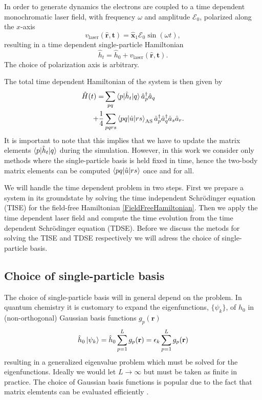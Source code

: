 \documentclass[a4paper,10pt, twocolumn]{article}
\begin{document}
In order to generate dynamics the electrons are coupled to a time dependent monochromatic laser field, with frequency $\omega$ and amplitude $\mathcal{E}_0$, polarized along the $x$-axis \cite{Zanghellini04}
\begin{equation}
 v_{\text{laser}}(\mathbf{\hat{r},t}) = \hat{\mathbf{x}}_1 \mathcal{E}_0 \sin(\omega t),
\end{equation}
resulting in a time dependent single-particle Hamiltonian
\begin{equation}
 \hat{h}_t = \hat{h}_0 + v_{\text{laser}}(\mathbf{\hat{r},t}).
\end{equation}
The choice of polarization axis is arbitrary. 

The total time dependent Hamiltonian of the system is then given by
\begin{align}
 \hat{H}(t) = &\sum_{pq} \braket{p|\hat{h}_t|q}\hat{a}_p^\dagger\hat{a}_q \nonumber \\
 + \frac{1}{4}&\sum_{pqrs}\braket{pq|\hat{u}|rs}_{\text{AS}}\hat{a}_p^\dagger\hat{a}_q^\dagger\hat{a}_s\hat{a}_r.
\end{align}
It is important to note that this implies that we have to update the matrix elements $\braket{p|\hat{h}_t|q}$ during the simulation. However, in this work we consider only methods where 
the single-particle basis is held fixed in time, hence the two-body matrix elements can be computed $\braket{pq|\hat{u}|rs}$ once and for all.

We will handle the time dependent problem in two steps. First we prepare a system in its groundstate by solving the time independent Schrödinger equation (TISE) for the field-free Hamiltonian \eqref{FieldFreeHamiltonian}. 
Then we apply the time dependent laser field and compute the time evolution from the time dependent Schrödinger equation (TDSE). 
Before we discuss the metods for solving the TISE and TDSE respectively we will adress the choice of single-particle basis.

\subsection{Choice of single-particle basis}
The choice of single-particle basis will in general depend on the problem. In quantum chemistry it is customary to expand the eigenfunctions, $\{ \psi_k \}$, 
of $\hat{h}_0$ in (non-orthogonal) Gaussian basis functions
$g_p(\mathbf{r})$
\begin{equation}
 \hat{h}_0 \ket{\psi_k} = \hat{h}_0 \sum_{p=1}^L g_p(\mathbf{r}) = \epsilon_k \sum_{p=1}^L g_p(\mathbf{r})
\end{equation}
resulting in a generalized eigenvalue problem which must be solved for the eigenfunctions. Ideally we would let $L \rightarrow \infty$ but must be taken as finite in practice. 
The choice of Gaussian basis functions is popular due to the fact that matrix elemtents can be evaluated efficiently \cite{Helgaker00book}.
\end{document}

